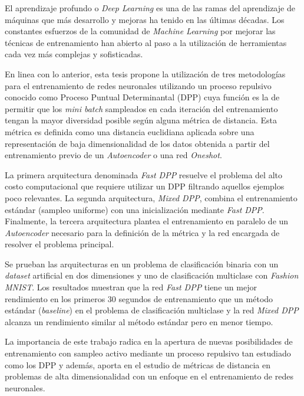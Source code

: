 \documentclass[
	spanish, %
	letterpaper, oneside
]{book}
\begin{document}
	
\templatePortrait

\templatePagecfg


\begin{abstractd}

El aprendizaje profundo o \textit{Deep Learning} es una de las ramas del aprendizaje de máquinas que más desarrollo y mejoras ha tenido en las últimas décadas. Los constantes esfuerzos de la comunidad de \textit{Machine Learning} por mejorar las técnicas de entrenamiento han abierto al paso a la utilización de herramientas cada vez más complejas y sofisticadas.

\vspace{0.2cm}

En linea con lo anterior, esta tesis propone la utilización de tres metodologías para el entrenamiento de redes neuronales utilizando un proceso repulsivo conocido como Proceso Puntual Determinantal (DPP) cuya función es la de permitir que los \textit{mini batch} sampleados en cada iteración del entrenamiento tengan la mayor diversidad posible según alguna métrica de distancia. Esta métrica es definida como una distancia euclidiana aplicada sobre una representación de baja dimensionalidad de los datos obtenida a partir del entrenamiento previo de un \textit{Autoencoder} o una red \textit{Oneshot}. 

\vspace{0.2cm}

La primera arquitectura denominada \textit{Fast DPP} resuelve el problema del alto costo computacional que requiere utilizar un DPP filtrando aquellos ejemplos poco relevantes. La segunda arquitectura, \textit{Mixed DPP}, combina el entrenamiento estándar (sampleo uniforme) con una inicialización mediante \textit{Fast DPP}. Finalmente, la tercera arquitectura plantea el entrenamiento en paralelo de un \textit{Autoencoder} necesario para la definición de la métrica y la red encargada de resolver el problema principal.

\vspace{0.2cm}

Se prueban las arquitecturas en un problema de clasificación binaria con un \textit{dataset} artificial en dos dimensiones y uno de clasificación multiclase con \textit{Fashion MNIST}. Los resultados muestran que la red \textit{Fast DPP} tiene un mejor rendimiento en los primeros 30 segundos de entrenamiento que un método estándar (\textit{baseline}) en el problema de clasificación multiclase y la red \textit{Mixed DPP} alcanza un rendimiento similar al método estándar pero en menor tiempo. 

\vspace{0.2cm}

La importancia de este trabajo radica en la apertura de nuevas posibilidades de entrenamiento con sampleo activo mediante un proceso repulsivo tan estudiado como los DPP y además, aporta en el estudio de métricas de distancia en problemas de alta dimensionalidad con un enfoque en el entrenamiento de redes neuronales.

\end{abstractd}
\end{document}
